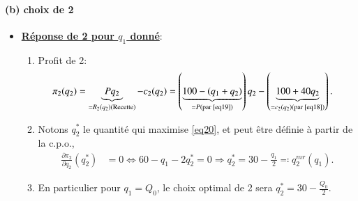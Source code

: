 \begin{frame}[allowframebreaks]{\insertsection}
\framesubtitle{(b) choix de 2}
    \begin{itemize}
    \item \textbf{\underline{Réponse de 2 pour $q_1$ donné}}:  
    \begin{enumerate}[-]
        \item Profit de 2:  
        \begin{align}
            \pi_2(q_2) &= \underbrace{Pq_2}_{=R_2(q_2)(\text{Recette})} -c_2(q_2) 
            = \left(\underbrace{100 - (q_1 + q_2)}_{=P(\text{par \eqref{eq19}})}\right)q_2 -
             \left( \underbrace{100 + 40q_2}_{=c_2(q_2)(\text{par \eqref{eq18}})}\right).
             \label{eq20}
        \end{align}
        \item Notons $q_2^*$ le quantité qui maximise \eqref{eq20}, 
        et peut être définie à partir de la c.p.o.,
        \begin{align}
            \frac{\partial \pi_2}{\partial q_2}(q_2^*) &=0\Leftrightarrow 60 - q_1-2q_2^{*}=0\Rightarrow 
            q_2^{*} = 30 - \frac{q_1}{2}\eqqcolon q_2^{mr}(q_1).
            \label{eq21}
        \end{align}
        \item En particulier pour $q_1=Q_0$, le choix optimal de 2 sera $q_2^* = 30 - \frac{Q_0}{2}$.
    \end{enumerate}
\end{itemize}
\end{frame}

